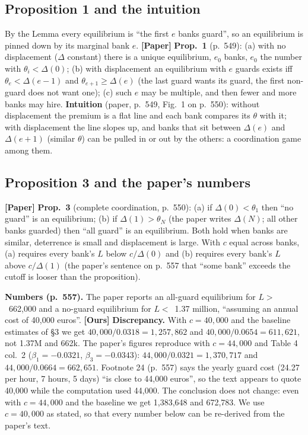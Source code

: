 \documentclass[11pt,a4paper]{article}
\newcommand{\eur}{\texteuro{}}
\newcommand{\paper}{\textbf{[Paper]}}
\newcommand{\ours}{\textbf{[Ours]}}
\newcommand{\Dl}{\Delta}
\begin{document}
\subsection{Proposition 1 and the intuition}
By the Lemma every equilibrium is ``the first $e$ banks guard'', so an equilibrium is pinned down by its
marginal bank $e$. \paper{} \textbf{Prop.\ 1} (p.\ 549): (a) with no displacement ($\Dl$ constant) there is a unique
equilibrium, $e_0$ banks, $e_0$ the number with $\theta_i<\Dl(0)$; (b) with displacement an equilibrium with $e$
guards exists iff $\theta_e<\Dl(e-1)$ and $\theta_{e+1}\ge\Dl(e)$ (the last guard wants its guard, the first non-guard
does not want one); (c) such $e$ may be multiple, and then fewer and more banks may hire. \textbf{Intuition} (paper,
p.\ 549, Fig.\ 1 on p.\ 550): without displacement the premium is a flat line and each bank compares its $\theta$ with it; with
displacement the line slopes up, and banks that sit between $\Dl(e)$ and $\Dl(e+1)$ (similar $\theta$) can be
pulled in or out by the others: a coordination game among them.

\subsection{Proposition 3 and the paper's numbers}
\paper{} \textbf{Prop.\ 3} (complete coordination, p.\ 550): (a) if $\Dl(0)<\theta_1$ then ``no guard'' is an equilibrium; (b) if
$\Dl(1)>\theta_N$ (the paper writes $\Dl(N)$; all other banks guarded) then ``all guard'' is an equilibrium. Both
hold when banks are similar, deterrence is small and displacement is large. With $c$ equal across banks,
(a) requires every bank's $L$ below $c/\Dl(0)$ and (b) requires every bank's $L$ above $c/\Dl(1)$ (the paper's
sentence on p.\ 557 that ``some bank'' exceeds the cutoff is looser than the proposition).

\textbf{Numbers (p.\ 557).} The paper reports an all-guard equilibrium for $L>$\ \eur662{,}000 and a no-guard
equilibrium for $L<$\ \eur1.37 million, ``assuming an annual cost of 40{,}000 euros''. \ours{} \textbf{Discrepancy.}
With $c=40{,}000$ and the baseline estimates of \S3 we get $40{,}000/0.0318=1{,}257{,}862$ and $40{,}000/0.0654=611{,}621$,
not 1.37M and 662k. The paper's figures reproduce with $c=44{,}000$ and Table 4 col.\ 2 ($\beta_1=-0.0321$,
$\beta_3=-0.0343$): $44{,}000/0.0321=1{,}370{,}717$ and $44{,}000/0.0664=662{,}651$. Footnote 24 (p.\ 557) says the
yearly guard cost (\eur24.27 per hour, 7 hours, 5 days) ``is close to 44,000 euros'', so the text appears to quote 40,000 while the
computation used 44,000. The conclusion does not change: even with $c=44{,}000$ and the baseline we get 1,383,648 and 672,783.
We use $c=40{,}000$ as stated, so that every number below can be re-derived from the paper's text.
\end{document}
